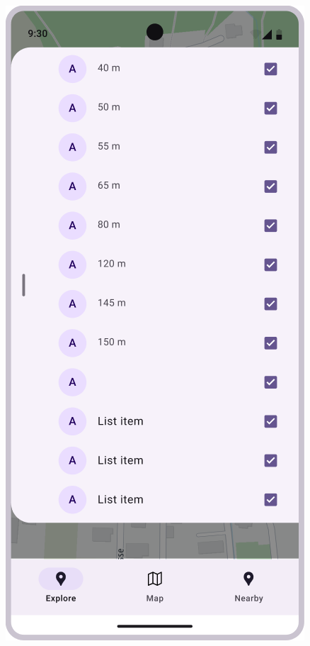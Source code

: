 \begin{figure}[H]
    \centering
    \begin{minipage}{0.26\textwidth}
        \centering
        \includegraphics[width=\textwidth]{images/paul/wireframes/listScreenv1.png}

\end{minipage}
\end{figure}
